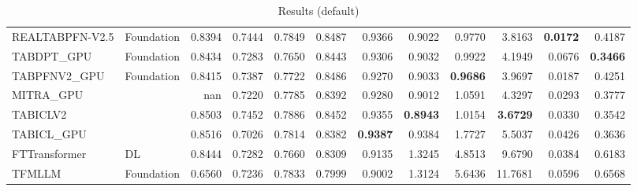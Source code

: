 \begin{table}[htbp]
{\begin{tabular}{ll|rrrrrrrrrr}
REALTABPFN-V2.5 & Foundation & 0.8394 & 0.7444 & 0.7849 & 0.8487 & 0.9366 & 0.9022 & 0.9770 & 3.8163 & \textbf{0.0172} & 0.4187 \\
TABDPT\_GPU & Foundation & 0.8434 & 0.7283 & 0.7650 & 0.8443 & 0.9306 & 0.9032 & 0.9922 & 4.1949 & 0.0676 & \textbf{0.3466} \\
TABPFNV2\_GPU & Foundation & 0.8415 & 0.7387 & 0.7722 & 0.8486 & 0.9270 & 0.9033 & \textbf{0.9686} & 3.9697 & 0.0187 & 0.4251 \\
MITRA\_GPU &  & nan & 0.7220 & 0.7785 & 0.8392 & 0.9280 & 0.9012 & 1.0591 & 4.3297 & 0.0293 & 0.3777 \\
TABICLV2 &  & 0.8503 & 0.7452 & 0.7886 & 0.8452 & 0.9355 & \textbf{0.8943} & 1.0154 & \textbf{3.6729} & 0.0330 & 0.3542 \\
TABICL\_GPU &  & 0.8516 & 0.7026 & 0.7814 & 0.8382 & \textbf{0.9387} & 0.9384 & 1.7727 & 5.5037 & 0.0426 & 0.3636 \\
\midrule
FTTransformer & DL & 0.8444 & 0.7282 & 0.7660 & 0.8309 & 0.9135 & 1.3245 & 4.8513 & 9.6790 & 0.0384 & 0.6183 \\
TFMLLM & Foundation & 0.6560 & 0.7236 & 0.7833 & 0.7999 & 0.9002 & 1.3124 & 5.6436 & 11.7681 & 0.0596 & 0.6568 \\
\bottomrule
\end{tabular}
}
\caption{Results (default)}
\label{tab:results_default}
\end{table}